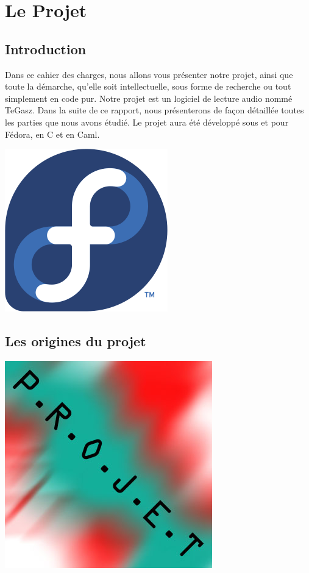 \documentclass[12pt]{report}
\begin{document}
\tableofcontents

\chapter{Le Projet}
	\section{Introduction}
Dans ce cahier des charges, nous allons vous présenter notre projet, ainsi que toute la démarche, qu'elle soit intellectuelle, sous forme de recherche ou tout simplement en code pur.
Notre projet est un logiciel de lecture audio nommé TeGasz. Dans la suite de ce rapport, nous présenterons de façon détaillée toutes les parties que nous avons étudié. Le projet aura été développé sous et pour Fédora, en C et en Caml.

\begin{center}
\includegraphics[scale = 0.2]{logo_fedo.png}
\end{center}
\newpage

	\section{Les origines du projet}

\begin{center}
\includegraphics[scale= 0.3]{./name.jpg}\\[1cm]  
\end{center}
\end{document}
